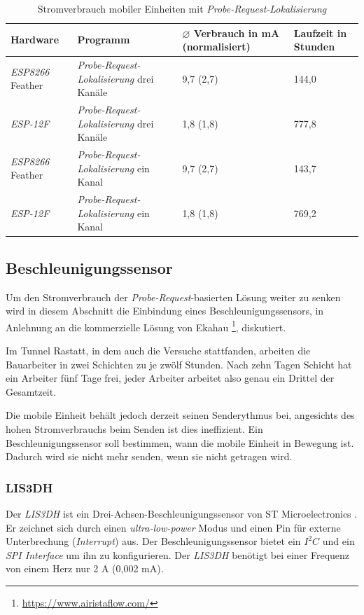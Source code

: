 \begin{table}[h!]
	\centering
	\caption{Stromverbrauch mobiler Einheiten mit \emph{Probe-Request-Lokalisierung}}
	\label{table:probereqina}
	\begin{tabular}{l|p{5.3cm}|R{2.5cm}|R{2.2cm}}
		Hardware & Programm & $\varnothing$ Verbrauch in mA (normalisiert) & Laufzeit in Stunden\\
		\hline
		\emph{ESP8266} Feather & \emph{Probe-Request-Lokalisierung} drei Kanäle & 9,7 (2,7) & 144,0\\
		\emph{ESP-12F} & \emph{Probe-Request-Lokalisierung} drei Kanäle & 1,8 (1,8) & 777,8\\
		\emph{ESP8266} Feather & \emph{Probe-Request-Lokalisierung} ein Kanal & 9,7 (2,7) & 143,7\\
		\emph{ESP-12F} & \emph{Probe-Request-Lokalisierung} ein Kanal & 1,8 (1,8) & 769,2\\
	\end{tabular}
\end{table}

\subsection{Beschleunigungssensor}
\label{ch:Beschleunigungssensor}
Um den Stromverbrauch der \emph{Probe-Request}-basierten Lösung weiter zu senken wird in diesem Abschnitt die Einbindung eines Beschleunigungssensors, in Anlehnung an die kommerzielle Lösung von Ekahau \footnote{\url{https://www.airistaflow.com/}}, diskutiert. 

Im Tunnel Rastatt, in dem auch die Versuche stattfanden, arbeiten die Bauarbeiter in zwei Schichten zu je zwölf Stunden. 
Nach zehn Tagen Schicht hat ein Arbeiter fünf Tage frei, jeder Arbeiter arbeitet also genau ein Drittel der Gesamtzeit. 

Die mobile Einheit behält jedoch derzeit seinen Senderythmus bei, angesichts des hohen Stromverbrauchs beim Senden ist dies ineffizient.
Ein Beschleunigungssensor soll bestimmen, wann die mobile Einheit in Bewegung ist. 
Dadurch wird sie nicht mehr senden, wenn sie nicht getragen wird.

\subsubsection{LIS3DH}
Der \emph{LIS3DH} ist ein Drei-Achsen-Beschleunigungssensor von ST Microelectronics \cite{st2015lis}.
Er zeichnet sich durch einen \emph{ultra-low-power} Modus und einen Pin für externe Unterbrechung (\emph{Interrupt}) aus.
Der Beschleunigungssensor bietet ein $I^2C$ und ein \emph{SPI Interface} um ihn zu konfigurieren.
Der \emph{LIS3DH} benötigt bei einer Frequenz von einem Herz nur 2 \textmu A (0,002 mA).


